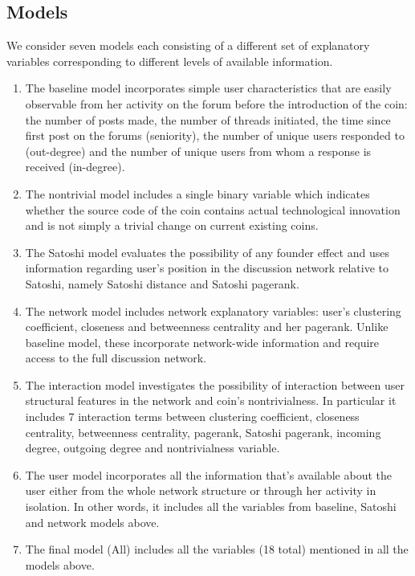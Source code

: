 
\subsection{Models}
We consider seven models each consisting of a different set of explanatory variables corresponding to different levels of available information.
\begin{enumerate}[topsep=0pt,itemsep=-0.5ex,partopsep=1ex,parsep=1ex]
 \item The baseline model incorporates simple user characteristics that are easily observable from her activity on the forum before the introduction of the coin: the number of posts made, the number of threads initiated, the time since first post on the forums (seniority), the number of unique users responded to (out-degree) and the number of unique users from whom a response is received (in-degree).
 \item The nontrivial model includes a single binary variable which indicates whether the source code of the coin contains actual technological innovation and is not simply a trivial change on current existing coins.
 \item The Satoshi model evaluates the possibility of any founder effect and uses information regarding user's position in the discussion network relative to Satoshi, namely Satoshi distance and Satoshi pagerank.
 \item The network model includes network explanatory variables: user's clustering coefficient, closeness and betweenness centrality and her pagerank. Unlike baseline model, these incorporate network-wide information and require access to the full discussion network.
 \item The interaction model investigates the possibility of interaction between user structural features in the network and coin's nontrivialness. In particular it includes 7 interaction terms between clustering coefficient, closeness centrality, betweenness centrality, pagerank, Satoshi pagerank, incoming degree, outgoing degree and nontrivialness variable.
 \item The user model incorporates all the information that's available about the user either from the whole network structure or through her activity in isolation. In other words, it includes all the variables from baseline, Satoshi and network models above.
 \item The final model (All) includes all the variables (18 total) mentioned in all the models above.
\end{enumerate}



